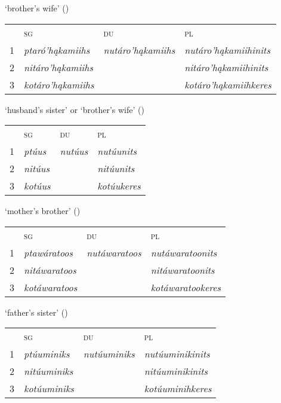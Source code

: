 \begin{exe}
\begin{xlist}
\item\label{ListOfKinshipTerms20} `brother's wife' (\Male)

    \begin{tabular}{llll}
    ~ &\textsc{sg}&\textsc{du}&\textsc{pl}\\
    1&  \textit{ptaró'hąkamiihs}&   \textit{nutáro'hąkamiihs}                                         &\textit{nutáro'hąkamiihinits}\\
    2&  \textit{nitáro'hąkamiihs}&    &\textit{nitáro'hąkamiihinits}\\
    3&  \textit{kotáro'hąkamiihs}&    &\textit{kotáro'hąkamiihkeres}
    \end{tabular}
    
\item\label{ListOfKinshipTerms21} `husband's sister' or `brother's wife' (\Female)

    \begin{tabular}{llll}
    ~ &\textsc{sg}&\textsc{du}&\textsc{pl}\\
    1&  \textit{ptúus}&   \textit{nutúus}                                         &\textit{nutúunits}\\
    2&  \textit{nitúus}&    &\textit{nitúunits}\\
    3&  \textit{kotúus}&    &\textit{kotúukeres}
    \end{tabular}
    
\item\label{ListOfKinshipTerms22} `mother’s brother' (\Hermaphrodite)

    \begin{tabular}{llll}
    ~ &\textsc{sg}&\textsc{du}&\textsc{pl}\\
    1&  \textit{ptawáratoos}&   \textit{nutáwaratoos}                                         &\textit{nutáwaratoonits}\\
    2&  \textit{nitáwaratoos}&    &\textit{nitáwaratoonits}\\
    3&  \textit{kotáwaratoos}&    &\textit{kotáwaratookeres}
    \end{tabular}

\newpage

\item\label{ListOfKinshipTerms23} `father's sister' (\Hermaphrodite)

    \begin{tabular}{llll}
    ~ &\textsc{sg}&\textsc{du}&\textsc{pl}\\
    1&  \textit{ptúuminiks}&   \textit{nutúuminiks}                                         &\textit{nutúuminikinits}\\
    2&  \textit{nitúuminiks}&    &\textit{nitúuminikinits}\\
    3&  \textit{kotúuminiks}&    &\textit{kotúuminihkeres}
    \end{tabular}




\end{xlist}
\end{exe}
